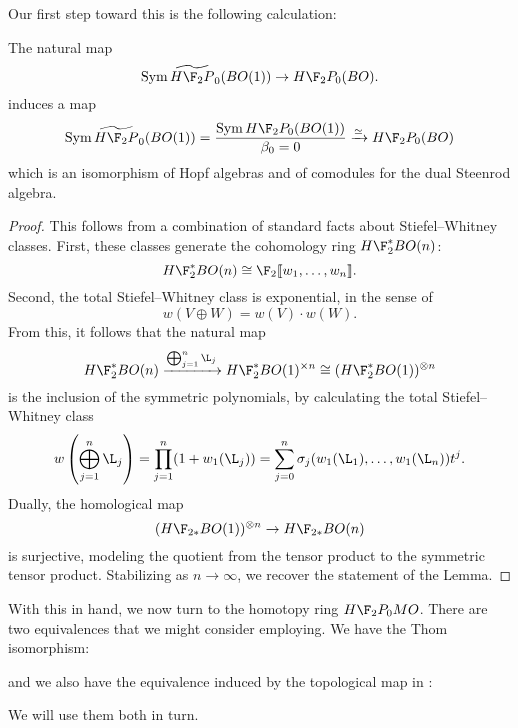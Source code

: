 Our first step toward this is the following calculation:
\begin{lemma}\label{HF2BOIsSymAlg}
The natural map \[\Sym \widetilde{H\F_2P}_0(BO(1)) \to H\F_2P_0(BO).\] induces a map \[\Sym \widetilde{H\F_2P}_0(BO(1)) = \frac{\Sym H\F_2P_0(BO(1))}{\beta_0 = 0} \xrightarrow{\simeq} H\F_2P_0(BO)\] which is an isomorphism of Hopf algebras and of comodules for the dual Steenrod algebra.
\end{lemma}
\begin{proof}
This follows from a combination of standard facts about Stiefel--Whitney classes.  First, these classes generate the cohomology ring $H\F_2^* BO(n)$: \[H\F_2^* BO(n) \cong \F_2\ps{w_1, \ldots, w_n}.\]  Second, the total Stiefel--Whitney class is exponential, in the sense of \[w(V \oplus W) = w(V) \cdot w(W).\]  From this, it follows that the natural map \[H\F_2^* BO(n) \xrightarrow{\bigoplus_{j=1}^n \L_j} H\F_2^* BO(1)^{\times n} \cong (H\F_2^* BO(1))^{\otimes n}\] is the inclusion of the symmetric polynomials, by calculating the total Stiefel--Whitney class \[w\left( \bigoplus_{j=1}^n \L_j \right) = \prod_{j=1}^n (1 + w_1(\L_j)) = \sum_{j=0}^n \sigma_j(w_1(\L_1), \ldots, w_1(\L_n)) t^j.\]  Dually, the homological map \[(H\F_{2*} BO(1))^{\otimes n} \to H\F_{2*} BO(n)\] is surjective, modeling the quotient from the tensor product to the symmetric tensor product.  Stabilizing as $n \to \infty$, we recover the statement of the Lemma.
\end{proof}

With this in hand, we now turn to the homotopy ring $H\F_2P_0 MO$.  There are two equivalences that we might consider employing.  We have the Thom isomorphism:
\begin{center}
\end{center}
and we also have the equivalence induced by the topological map in :
\begin{center}
\end{center}
We will use them both in turn.

